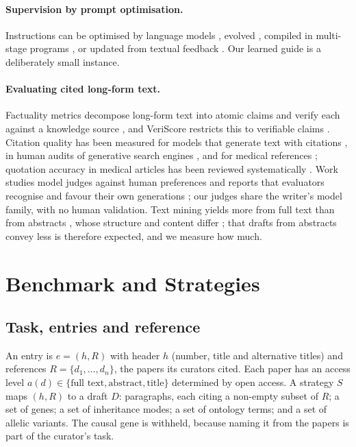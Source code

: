 \documentclass{article} %
\begin{document}
\paragraph{Supervision by prompt optimisation.}
Instructions can be optimised by language models \citep{Zhou2022LargeLanguage,Pryzant2023AutomaticPrompt,Yang2023LargeLanguage}, evolved \citep{Guo2023EvopromptConnecting,Fernando2023PromptbreederSelfreferential,agrawal2026gepa}, compiled in multi-stage programs \citep{Khattab2023DspyCompiling,Opsahlong2024OptimizingInstructions}, or updated from textual feedback \citep{Yuksekgonul2024TextgradAutomatic}. Our learned guide is a deliberately small instance.

\paragraph{Evaluating cited long-form text.}
Factuality metrics decompose long-form text into atomic claims and verify each against a knowledge source \citep{min2023factscore,wei2024longform}, and VeriScore restricts this to verifiable claims \citep{Song2024VeriscoreEvaluating}. Citation quality has been measured for models that generate text with citations \citep{gao2023enabling}, in human audits of generative search engines \citep{Liu2023EvaluatingVerifiability}, and for medical references \citep{wu2025automated}; quotation accuracy in medical articles has been reviewed systematically \citep{jergas2015quotation}. Work studies model judges against human preferences \citep{zheng2023judging,shankar2024who} and reports that evaluators recognise and favour their own generations \citep{panickssery2024llm}; our judges share the writer's model family, with no human validation. Text mining yields more from full text than from abstracts \citep{Westergaard2018ComprehensiveQuantitative}, whose structure and content differ \citep{Cohen2010StructuralContent}; that drafts from abstracts convey less is therefore expected, and we measure how much.

\section{Benchmark and Strategies}
\label{sec:method}
\subsection{Task, entries and reference}
\label{sec:task}
An entry is $e=(h,R)$ with header $h$ (number, title and alternative titles) and references $R=\{d_1,\dots,d_n\}$, the papers its curators cited. Each paper has an access level $a(d)\in\{\text{full text},\text{abstract},\text{title}\}$ determined by open access. A strategy $S$ maps $(h,R)$ to a draft $D$: paragraphs, each citing a non-empty subset of $R$; a set of genes; a set of inheritance modes; a set of ontology terms; and a set of allelic variants. The causal gene is withheld, because naming it from the papers is part of the curator's task.
\end{document}
